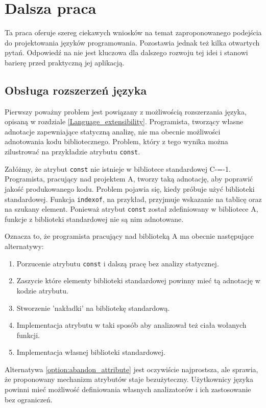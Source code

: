 \section{Dalsza praca}

Ta praca oferuje szereg ciekawych wniosków na temat zaproponowanego podejścia do projektowania języków programowania.
Pozostawia jednak też kilka otwartych pytań.
Odpowiedź na nie jest kluczowa dla dalszego rozwoju tej idei i stanowi barierę przed praktyczną jej aplikacją.

\subsection{Obsługa rozszerzeń języka}
\label{further:language_extension}
Pierwszy poważny problem jest powiązany z możliwością rozszerzania języka, opisaną w rozdziale \ref{Language_extensibility}.
Programista, tworzący własne adnotacje zapewniające statyczną analizę, nie ma obecnie możliwości adnotowania kodu bibliotecznego.
Problem, który z tego wynika można zilustrować na przykładzie atrybutu \lstinline{const}.

Załóżmy, że atrybut \lstinline{const} nie istnieje w bibliotece standardowej C-=-1.
Programista, pracujący nad projektem A, tworzy taką adnotację, aby poprawić jakość produkowanego kodu.
Problem pojawia się, kiedy próbuje użyć biblioteki standardowej.
Funkcja \lstinline{indexof}, na przykład, przyjmuje wskazanie na tablicę oraz na szukany element.
Ponieważ atrybut \lstinline{const} został zdefiniowany w bibliotece A, funkcje z biblioteki standardowej nie są nim adnotowane.

Oznacza to, że programista pracujący nad biblioteką A ma obecnie następujące alternatywy:
\begin{enumerate}
	\item\label{option:abandon_attribute} Porzucenie atrybutu \lstinline{const} i dalszą pracę bez analizy statycznej.
	\item\label{option:embed_in_attribute} Zaszycie które elementy biblioteki standardowej powinny mieć tą adnotację w kodzie atrybutu.
	\item\label{option:std_library_fascade} Stworzenie 'nakładki' na bibliotekę standardową.
	\item\label{option:analize_function_bodies} Implementacja atrybutu w taki sposób aby analizował też ciała wołanych funkcji.
	\item\label{option:own_std_lib} Implementacja własnej biblioteki standardowej.
\end{enumerate}
Alternatywa \ref{option:abandon_attribute} jest oczywiście najprostsza, ale sprawia, że proponowany mechanizm atrybutów staje bezużyteczny. 
Użytkownicy języka powinni mieć możliwość definiowania własnych analizatorów i ich zastosowanie bez ograniczeń.


